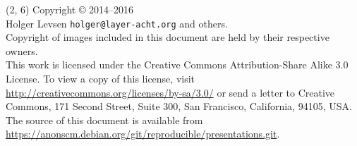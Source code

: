 \documentclass[14pt,aspectratio=169]{beamer}
\begin{document}
\begin{frame}{}
\begin{textblock}{12}(2, 6)
    \tiny{
      Copyright \copyright{} 2014--2016 \\
         Holger Levsen \texttt{holger@layer-acht.org} and others.\\[3.0mm]
      Copyright of images included in this document are held by
      their respective owners.
      \\[3.0mm]
      This work is licensed under the \alert{Creative Commons
        Attribution-Share Alike 3.0} License.  To view a copy of this
      license, visit
      \url{http://creativecommons.org/licenses/by-sa/3.0/} or send a
      letter to Creative Commons, 171 Second Street, Suite 300, San
      Francisco, California, 94105, USA.
      \\[2.0mm]
      The source of this document is available from
      \url{https://anonscm.debian.org/git/reproducible/presentations.git}.
    }
  \end{textblock}
\end{frame}
\end{document}
